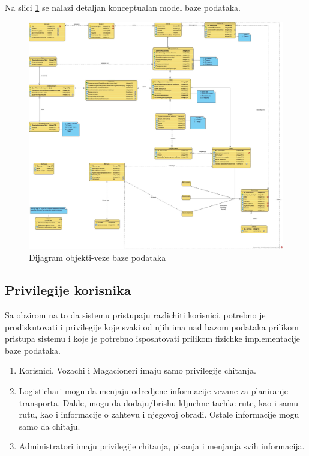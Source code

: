 Na slici \ref{fig:er} se nalazi detaljan konceptualan model baze podataka.

\begin{figure}[!h]
    \centering
    \includegraphics[width=14cm]{Slike/ER.jpg}
    \caption{Dijagram objekti-veze baze podataka}
    \label{fig:er}
\end{figure}

\subsection{Privilegije korisnika}
Sa obzirom na to da sistemu pristupaju razlichiti korisnici, potrebno je prodiskutovati i privilegije koje svaki od njih ima nad bazom podataka prilikom pristupa sistemu i koje je potrebno isposhtovati prilikom fizichke implementacije baze podataka.

\begin{enumerate}
    \item Korisnici, Vozachi i Magacioneri imaju samo privilegije chitanja.
    \item Logistichari mogu da menjaju odredjene informacije vezane za planiranje transporta. Dakle, mogu da dodaju/brishu kljuchne tachke rute, kao i samu rutu, kao i informacije o zahtevu i njegovoj obradi. Ostale informacije mogu samo da chitaju.

    \item Administratori imaju privilegije chitanja, pisanja i menjanja svih informacija.
    
\end{enumerate}
